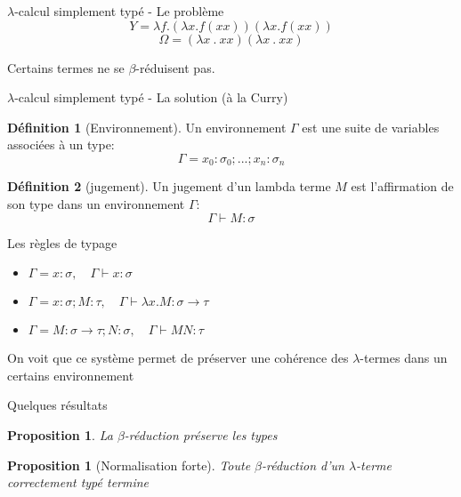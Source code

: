 \documentclass[11pt,a4paper]{beamer}
\theoremstyle{plain}
\newtheorem{prop}[thm]{Proposition}
\theoremstyle{definition}
\newtheorem{defn}{Définition}[section]
\theoremstyle{remark}
\begin{document}
\begin{frame}{$\lambda$-calcul simplement typé - Le problème}
$$ Y = \lambda f . (\lambda x. f (xx)) (\lambda x.f (xx))$$
$$ \Omega = (\lambda x \ . \ xx) (\lambda x \ . \ xx) $$

Certains termes ne se $\beta$-réduisent pas.
\end{frame}

\begin{frame}{$\lambda$-calcul simplement typé - La solution (à la Curry)}
\begin{defn}[Environnement]
Un environnement $\Gamma$ est une suite de variables associées à un type: $$\Gamma = x_0:\sigma_0;...;x_n:\sigma_n$$
\end{defn}
\begin{defn}[jugement]
Un jugement d'un lambda terme $M$ est l'affirmation de son type dans un environnement $\Gamma$:
$$ \Gamma \vdash M : \sigma $$
\end{defn}
\end{frame}

\begin{frame}{Les règles de typage}
\begin{itemize}
	\item  $ \Gamma = x:\sigma, \quad \Gamma \vdash x : \sigma $
	\item  $ \Gamma = x:\sigma;M:\tau, \quad \Gamma \vdash \lambda x.M : \sigma \to \tau $
	\item  $ \Gamma = M:\sigma \to \tau; N: \sigma, \quad \Gamma \vdash MN : \tau $
\end{itemize}
On voit que ce système permet de préserver une cohérence des $\lambda$-termes dans un certains environnement
\end{frame}

\begin{frame}{Quelques résultats}
\begin{prop}
La $\beta$-réduction préserve les types
\end{prop}

\begin{prop}[Normalisation forte]
Toute $\beta$-réduction d'un $\lambda$-terme correctement typé termine
\end{prop}
\end{frame}
\end{document}
